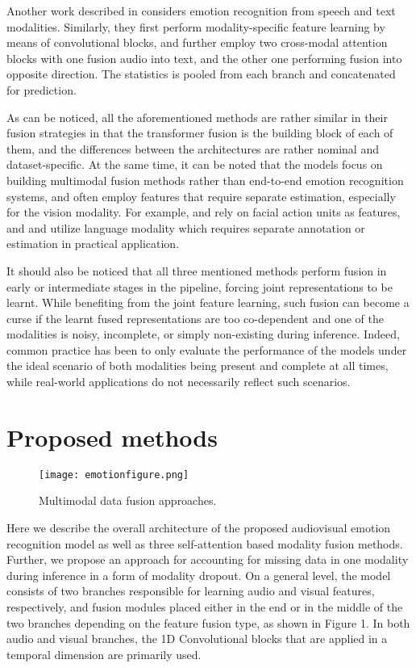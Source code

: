 \documentclass[a4paper,conference]{IEEEtran}
\begin{document}
Another work described in \cite{interspeech} considers emotion recognition from speech and text modalities. Similarly, they first perform modality-specific feature learning by means of convolutional blocks, and further employ two cross-modal attention blocks with one fusion audio into text, and the other one performing fusion into opposite direction. The statistics is pooled from each branch and concatenated for prediction.

As can be noticed, all the aforementioned methods are rather similar in their fusion strategies in that the transformer fusion is the building block of each of them, and the differences between the architectures are rather nominal and dataset-specific. At the same time, it can be noted that the models focus on building multimodal fusion methods rather than end-to-end emotion recognition systems, and often employ features that require separate estimation, especially for the vision modality. For example, \cite{mult} and \cite{icasspav} rely on facial action units as features, and \cite{mult} and \cite{interspeech} utilize language modality which requires separate annotation or estimation in practical application.

It should also be noticed that all three mentioned methods perform fusion in early or intermediate stages in the pipeline, forcing joint representations to be learnt. While benefiting from the joint feature learning, such fusion can become a curse if the learnt fused representations are too co-dependent and one of the modalities is noisy, incomplete, or simply non-existing during inference. Indeed, common practice has been to only evaluate the performance of the models under the ideal scenario of both modalities being present and complete at all times, while real-world applications do not necessarily reflect such scenarios.

\section{Proposed methods}
\begin{figure*}[h]
\texttt{[image: emotionfigure.png]}
\caption{Multimodal data fusion approaches.}
\end{figure*}

Here we describe the overall architecture of the proposed audiovisual emotion recognition model as well as three self-attention based modality fusion methods. Further, we propose an approach for accounting for missing data in one modality during inference in a form of modality dropout. On a general level, the model consists of two branches responsible for learning audio and visual features, respectively, and fusion modules placed either in the end or in the middle of the two branches depending on the feature fusion type, as shown in Figure 1. In both audio and visual branches, the 1D Convolutional blocks that are applied in a temporal dimension are primarily used.
\end{document}
